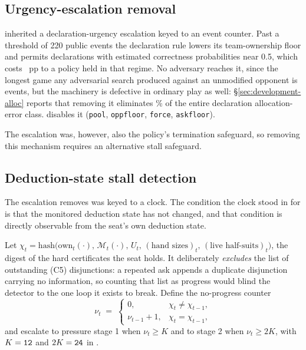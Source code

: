 \subsection{Urgency-escalation removal}
\label{sec:agent-urgency}

\vsix{} inherited a declaration-urgency escalation keyed to an event counter. Past a threshold of 220
public events the declaration rule lowers its team-ownership floor and permits declarations with
estimated correctness probabilities near 0.5, which costs \vsevenCliff{}~pp to a policy held in that
regime. No adversary
reaches it, since the longest game any adversarial search produced against an unmodified opponent is
\vsevenCliffIncumbentTail{} events, but the machinery is defective in ordinary play as well:
\S\ref{sec:development-alloc} reports that removing it eliminates \vsevenLoneUrgencyShare\% of the
entire declaration allocation-error class. \sestina{} disables it
(\texttt{pool}, \texttt{oppfloor}, \texttt{force}, \texttt{askfloor}).

The escalation was, however, also the policy's termination safeguard, so removing this mechanism
requires an alternative stall safeguard.

\subsection{Deduction-state stall detection}
\label{sec:agent-stall}

The escalation \sestina{} removes was keyed to a clock. The condition the clock stood in for is
that the monitored deduction state has not changed, and that condition is directly observable from
the seat's own deduction state.

Let $\chi_t = \mathrm{hash}\bigl(\mathrm{own}_t(\cdot),\, \mathcal{M}_t(\cdot),\, U_t,\,
(\text{hand sizes})_t,\, (\text{live half-suits})_t\bigr)$, the digest of the hard certificates the
seat holds. It deliberately \emph{excludes} the list of outstanding (C5) disjunctions: a repeated ask
appends a duplicate disjunction carrying no information, so counting that list as progress would
blind the detector to the one loop it exists to break. Define the
no-progress counter
\begin{equation}
  \nu_t \;=\;
  \begin{cases}
    0, & \chi_t \neq \chi_{t-1},\\
    \nu_{t-1} + 1, & \chi_t = \chi_{t-1},
  \end{cases}
  \label{eq:stall}
\end{equation}
and escalate to pressure stage 1 when $\nu_t \ge K$ and to stage 2 when $\nu_t \ge 2K$, with
$K = \texttt{12{}}$ and $2K = \texttt{24{}}$ in \sestina{}.

